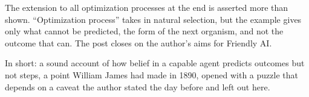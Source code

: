 \begin{afterword}
The extension to all optimization processes at the end is asserted more than shown. ``Optimization process'' takes in natural selection, but the example gives only what cannot be predicted, the form of the next organism, and not the outcome that can. The post closes on the author's aims for Friendly AI.

In short: a sound account of how belief in a capable agent predicts outcomes but not steps, a point William James had made in 1890, opened with a puzzle that depends on a caveat the author stated the day before and left out here.
\end{afterword}
